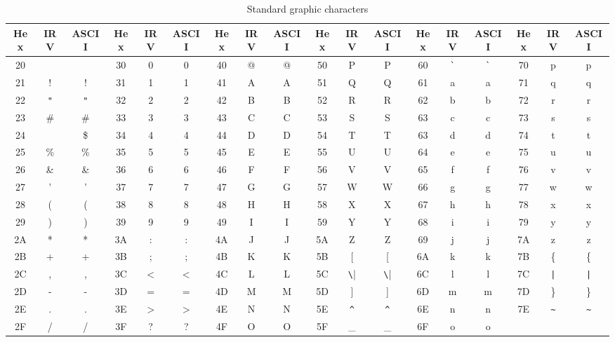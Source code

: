 \begin{table}[ht]
  \begin{center}
	\caption{Standard graphic characters}
	\label{table:ASCII}
	\small
	\begin{tabular}{c@{~}c@{~}c|c@{~}c@{~}c|c@{~}c@{~}c|c@{~}c@{~}c|c@{~}c@{~}c|c@{~}c@{~}c}
	\hline\hline
	Hex & IRV & ASCII &
	Hex & IRV & ASCII &
	Hex & IRV & ASCII &
	Hex & IRV & ASCII &
	Hex & IRV & ASCII &
	Hex & IRV & ASCII \\
	\hline
	20&   &		&30& 0 & 0	&40& @ & @	&50& P & P	&60& \verb|`| & \verb|`|
																&70& p & p	\\
	21& ! & !	&31& 1 & 1	&41& A & A	&51& Q & Q	&61& a & a	&71& q & q	\\
	22& \verb|"| & \verb|"|
				&32& 2 & 2	&42& B & B	&52& R & R	&62& b & b	&72& r & r	\\
	23& \# & \# &33& 3 & 3	&43& C & C	&53& S & S	&63& c & c	&73& s & s	\\
	24& \textcurrency  & \$ &34& 4 & 4	&44& D & D	&54& T & T	&63& d & d	&74& t & t	\\
	25& \% & \% &35& 5 & 5	&45& E & E	&55& U & U	&64& e & e	&75& u & u	\\
	26& \& & \& &36& 6 & 6	&46& F & F	&56& V & V	&65& f & f	&76& v & v	\\
	27& '  & '	&37& 7 & 7	&47& G & G	&57& W & W	&66& g & g	&77& w & w	\\
	28& (  & (	&38& 8 & 8	&48& H & H	&58& X & X	&67& h & h	&78& x & x	\\
	29& )  & )	&39& 9 & 9	&49& I & I	&59& Y & Y	&68& i & i	&79& y & y	\\
	2A& *  & *	&3A& : & :	&4A& J & J	&5A& Z & Z	&69& j & j	&7A& z & z	\\
	2B& +  & +	&3B& ; & ;	&4B& K & K	&5B& [ & [	&6A& k & k	&7B& \{&\{	\\
	2C& ,  & ,	&3C&$<$&$<$	&4C& L & L	&5C& \verb|\| & \verb|\|
													&6C& l & l	&7C& \verb"|" & \verb"|" \\
	2D& -  & -	&3D& = & =	&4D& M & M	&5D& ] & ]	&6D& m & m	&7D& \}&\}	\\
	2E& .  & .	&3E&$>$&$>$	&4E& N & N	&5E& \verb|^| & \verb|^|
													&6E& n & n	&7E& \verb|~| & \verb|~| \\
	2F& /  & /	&3F& ? & ?	&4F& O & O	&5F& \_ & \_&6F& o & o	\\
	\hline\hline
	\end{tabular}
  \end{center}
\end{table}

